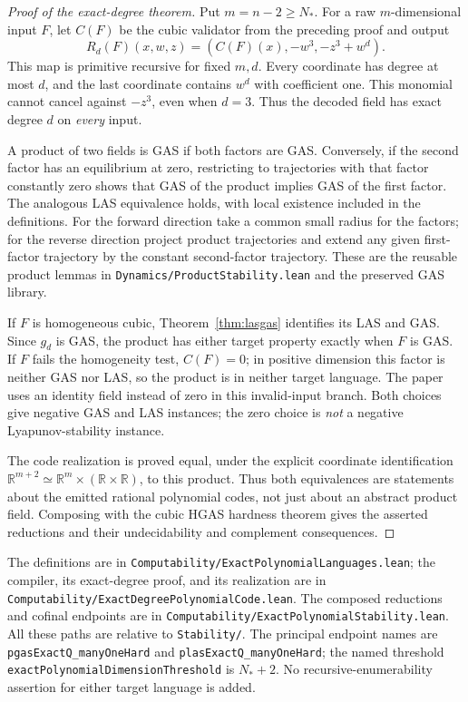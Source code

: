 \documentclass[11pt]{article}
\newcommand{\R}{\mathbb R}
\newcommand{\code}[1]{{\small\nolinkurl{#1}}}
\begin{document}
\begin{proof}[Proof of the exact-degree theorem]
Put $m=n-2\ge N_*$. For a raw $m$-dimensional input $F$, let $C(F)$ be
the cubic validator from the preceding proof and output
\[
 R_d(F)(x,w,z)=(C(F)(x),-w^3,-z^3+w^d).
\]
This map is primitive recursive for fixed $m,d$. Every coordinate has
degree at most $d$, and the last coordinate contains $w^d$ with coefficient
one. This monomial cannot cancel against $-z^3$, even when $d=3$.
Thus the decoded field has exact degree $d$ on \emph{every} input.

A product of two fields is GAS if both factors are GAS. Conversely, if
the second factor has an equilibrium at zero, restricting to trajectories
with that factor constantly zero shows that GAS of the product implies
GAS of the first factor. The analogous LAS equivalence holds, with local
existence included in the definitions. For the forward direction take a
common small radius for the factors; for the reverse direction project
product trajectories and extend any given first-factor trajectory by the
constant second-factor trajectory. These are the reusable product lemmas
in \code{Dynamics/ProductStability.lean} and the preserved GAS library.

If $F$ is homogeneous cubic, Theorem~\ref{thm:lasgas} identifies its LAS
and GAS. Since $g_d$ is GAS, the product has either target property exactly
when $F$ is GAS. If $F$ fails the homogeneity test, $C(F)=0$; in positive
dimension this factor is neither GAS nor LAS, so the product is in neither
target language. The paper uses an identity field instead of zero in this
invalid-input branch. Both choices give negative GAS and LAS instances;
the zero choice is \emph{not} a negative Lyapunov-stability instance.

The code realization is proved equal, under the explicit coordinate
identification $\R^{m+2}\simeq\R^m\times(\R\times\R)$, to this product.
Thus both equivalences are statements about the emitted rational
polynomial codes, not just about an abstract product field. Composing with
the cubic HGAS hardness theorem gives the asserted reductions and their
undecidability and complement consequences.
\end{proof}

The definitions are in \code{Computability/ExactPolynomialLanguages.lean};
the compiler, its exact-degree proof, and its realization are in
\code{Computability/ExactDegreePolynomialCode.lean}. The composed reductions
and cofinal endpoints are in
\code{Computability/ExactPolynomialStability.lean}.
All these paths are relative to \code{Stability/}. The principal endpoint
names are \code{pgasExactQ_manyOneHard} and \code{plasExactQ_manyOneHard};
the named threshold \code{exactPolynomialDimensionThreshold} is $N_*+2$.
No recursive-enumerability assertion for either target language is added.
\end{document}
